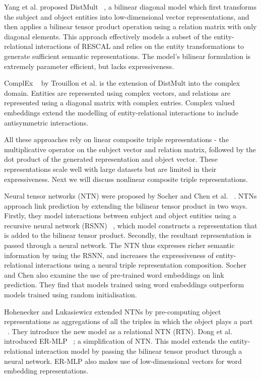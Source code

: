\noindent Yang et al. proposed DistMult \unskip~\citep{yang2014embedding}, a bilinear diagonal model which first transforms the subject and object entities into low-dimensional vector representations, and then applies a bilinear tensor product operation using a relation matrix with only diagonal elements. This approach effectively models a subset of the entity-relational interactions of RESCAL and relies on the entity transformations to generate sufficient semantic representations. The model's bilinear formulation is extremely parameter efficient, but lacks expressiveness. \par

\noindent ComplEx \unskip~\citep{trouillon2016complex} by Trouillon et al. is the extension of DistMult into the complex domain. Entities are represented using complex vectors, and relations are represented using a diagonal matrix with complex entries. Complex valued embeddings extend the modelling of entity-relational interactions to include antisymmetric interactions. \par

\noindent All these approaches rely on linear composite triple representations - the multiplicative operator on the subject vector and relation matrix, followed by the dot product of the generated representation and object vector. These representations scale well with large datasets but are limited in their expressiveness. Next we will discuss nonlinear composite triple representations. \par

\noindent Neural tensor networks (NTN) were proposed by Socher and Chen et al. \unskip~\citep{socher2013reasoning}. NTNs approach link prediction by extending the bilinear tensor product in two ways. Firstly, they model interactions between subject and object entities using a recursive neural network (RSNN) \unskip~\citep{socher2012semantic}, which model constructs a representation that is added to the bilinear tensor product. Secondly, the resultant representation is passed through a neural network. The NTN thus expresses richer semantic information by using the RSNN, and increases the expressiveness of entity-relational interactions using a neural triple representation composition. Socher and Chen also examine the use of pre-trained word embeddings on link prediction. They find that models trained using word embeddings outperform models trained using random initialisation. \par

\noindent Hohenecker and Lukasiewicz extended NTNs by pre-computing object representations as aggregations of all the triples in which the object plays a part \unskip~\citep{hohenecker2017deep}. They introduce the new model as a relational NTN (RTN). Dong et al. introduced ER-MLP \unskip~\citep{dong2014knowledge, nickel2015review}; a simplification of NTN. This model extends the entity-relational interaction model by passing the bilinear tensor product through a neural network. ER-MLP also makes use of low-dimensional vectors for word embedding representations. \par

